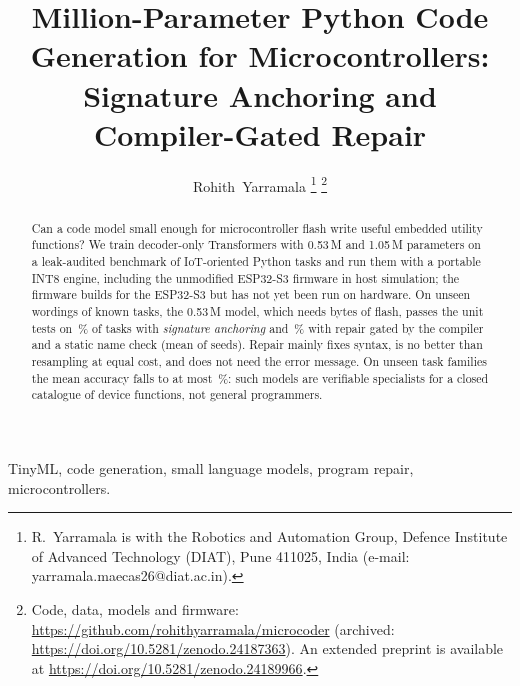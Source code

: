 \documentclass[journal]{IEEEtran}
\begin{document}
\title{Million-Parameter Python Code Generation for Microcontrollers: Signature Anchoring and Compiler-Gated Repair}
\author{Rohith~Yarramala%
\thanks{R.~Yarramala is with the Robotics and Automation Group, Defence Institute of Advanced Technology (DIAT), Pune 411025, India (e-mail: yarramala.maecas26@diat.ac.in).}%
\thanks{Code, data, models and firmware: \protect\url{https://github.com/rohithyarramala/microcoder} (archived: \protect\url{https://doi.org/10.5281/zenodo.24187363}). An extended preprint is available at \protect\url{https://doi.org/10.5281/zenodo.24189966}.}}
\maketitle

\begin{abstract}
Can a code model small enough for microcontroller flash write useful embedded utility functions? We train decoder-only Transformers with 0.53\,M and 1.05\,M parameters on a leak-audited benchmark of IoT-oriented Python tasks and run them with a portable INT8 engine, including the unmodified ESP32-S3 firmware in host simulation; the firmware builds for the ESP32-S3 but has not yet been run on hardware. On unseen wordings of known tasks, the 0.53\,M model, which needs \dsmflashtotalbytes{} bytes of flash, passes the unit tests on \seedsSmalltestidanchor\,\% of tasks with \emph{signature anchoring} and \seedsSmalltestidareflint\,\% with repair gated by the compiler and a static name check (mean of \nseeds{} seeds). Repair mainly fixes syntax, is no better than resampling at equal cost, and does not need the error message. On unseen task families the mean accuracy falls to at most \seedsSmalltestoodareflint\,\%: such models are verifiable specialists for a closed catalogue of device functions, not general programmers.
\end{abstract}

\begin{IEEEkeywords}
TinyML, code generation, small language models, program repair, microcontrollers.
\end{IEEEkeywords}
\end{document}
